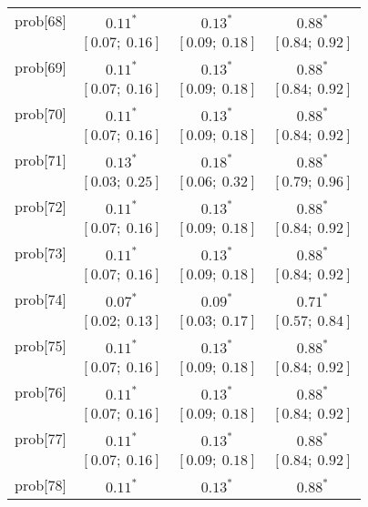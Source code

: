 \begin{table}
\begin{center}
\begin{tabular}{l c c c }
prob[68]  & $0.11^{*}$              & $0.13^{*}$              & $0.88^{*}$            \\
          & $[0.07;\ 0.16]$         & $[0.09;\ 0.18]$         & $[0.84;\ 0.92]$       \\
prob[69]  & $0.11^{*}$              & $0.13^{*}$              & $0.88^{*}$            \\
          & $[0.07;\ 0.16]$         & $[0.09;\ 0.18]$         & $[0.84;\ 0.92]$       \\
prob[70]  & $0.11^{*}$              & $0.13^{*}$              & $0.88^{*}$            \\
          & $[0.07;\ 0.16]$         & $[0.09;\ 0.18]$         & $[0.84;\ 0.92]$       \\
prob[71]  & $0.13^{*}$              & $0.18^{*}$              & $0.88^{*}$            \\
          & $[0.03;\ 0.25]$         & $[0.06;\ 0.32]$         & $[0.79;\ 0.96]$       \\
prob[72]  & $0.11^{*}$              & $0.13^{*}$              & $0.88^{*}$            \\
          & $[0.07;\ 0.16]$         & $[0.09;\ 0.18]$         & $[0.84;\ 0.92]$       \\
prob[73]  & $0.11^{*}$              & $0.13^{*}$              & $0.88^{*}$            \\
          & $[0.07;\ 0.16]$         & $[0.09;\ 0.18]$         & $[0.84;\ 0.92]$       \\
prob[74]  & $0.07^{*}$              & $0.09^{*}$              & $0.71^{*}$            \\
          & $[0.02;\ 0.13]$         & $[0.03;\ 0.17]$         & $[0.57;\ 0.84]$       \\
prob[75]  & $0.11^{*}$              & $0.13^{*}$              & $0.88^{*}$            \\
          & $[0.07;\ 0.16]$         & $[0.09;\ 0.18]$         & $[0.84;\ 0.92]$       \\
prob[76]  & $0.11^{*}$              & $0.13^{*}$              & $0.88^{*}$            \\
          & $[0.07;\ 0.16]$         & $[0.09;\ 0.18]$         & $[0.84;\ 0.92]$       \\
prob[77]  & $0.11^{*}$              & $0.13^{*}$              & $0.88^{*}$            \\
          & $[0.07;\ 0.16]$         & $[0.09;\ 0.18]$         & $[0.84;\ 0.92]$       \\
prob[78]  & $0.11^{*}$              & $0.13^{*}$              & $0.88^{*}$            \\

\end{tabular}
\end{center}
\end{table}

